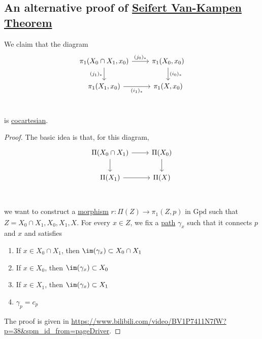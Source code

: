\subsection{An alternative proof of \hyperref[thm:Seifert-Van-Kampen-Theorem]{Seifert Van-Kampen Theorem}}\label{pf:an-alternative-proof-of-Seifert-Van-Kampen-thm}
\begin{theorem}
	We claim that the diagram
	\[
		\begin{tikzcd}
			{\pi_1(X_0\cap X_1, x_0)} & {\pi_1(X_0, x_0)} \\
			{\pi_1(X_1, x_0)} & {\pi_1(X, x_0)} \\
			\arrow["{(j_0)_\ast}", from=1-1, to=1-2]
			\arrow["{(i_0)_\ast}", from=1-2, to=2-2]
			\arrow["{(i_1)_\ast}"', from=2-1, to=2-2]
			\arrow["{(j_1)_\ast}"', from=1-1, to=2-1]
		\end{tikzcd}
	\]
	is \hyperref[def:cocartesian]{cocartesian}.
\end{theorem}
\begin{proof}
	The basic idea is that, for this diagram,
	\[
		\begin{tikzcd}
			{\Pi(X_0\cap X_1)} & {\Pi(X_0)} \\
			{\Pi(X_1)} & {\Pi(X)} \\
			\arrow[from=1-1, to=1-2]
			\arrow[from=1-2, to=2-2]
			\arrow[from=2-1, to=2-2]
			\arrow[from=1-1, to=2-1]
		\end{tikzcd}
	\]
	we want to construct a \hyperref[def:morphism]{morphism} \(r\colon \Pi (Z)\to \pi _1(Z, p)\) in \(\underline{\mathrm{Gpd}}\) such that
	\(Z = X_0 \cap X_1, X_0, X_1, X\). For every \(x\in Z\), we fix a \hyperref[def:path]{path} \(\gamma _{x} \) such that it connects \(p\) and \(x\) and satisfies
	\begin{enumerate}
		\item If \(x\in X_0 \cap X_1\), then \(\im  (\gamma _{x} )\subset X_0 \cap X_1\)
		\item If \(x\in X_0\), then \(\im  (\gamma _{x} )\subset X_0\)
		\item If \(x\in X_1\), then \(\im  (\gamma _{x} )\subset X_1\)
		\item \(\gamma _p = c_p\)
	\end{enumerate}

	The proof is given in \url{https://www.bilibili.com/video/BV1P7411N7fW?p=38&spm_id_from=pageDriver}.
\end{proof}

